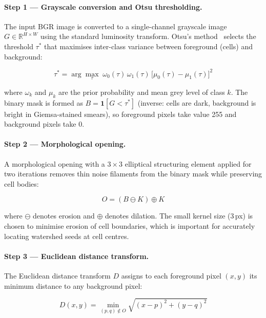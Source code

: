 \documentclass[review,12pt]{elsarticle}
\begin{document}
\paragraph{Step 1 --- Grayscale conversion and Otsu thresholding.}
The input BGR image is converted to a single-channel grayscale image
$G \in \mathbb{R}^{H \times W}$ using the standard luminosity transform.
Otsu's method~\cite{otsu1979} selects the threshold $\tau^*$ that maximises
inter-class variance between foreground (cells) and background:

\begin{equation}
  \tau^* = \arg\max_\tau \; \omega_0(\tau)\,\omega_1(\tau)\,
  \bigl[\mu_0(\tau) - \mu_1(\tau)\bigr]^2
  \label{eq:otsu}
\end{equation}

where $\omega_k$ and $\mu_k$ are the prior probability and mean grey level
of class $k$. The binary mask is formed as $B = \mathbf{1}[G < \tau^*]$
(inverse: cells are dark, background is bright in Giemsa-stained smears),
so foreground pixels take value 255 and background pixels take 0.

\paragraph{Step 2 --- Morphological opening.}
A morphological opening with a $3 \times 3$ elliptical structuring element
applied for two iterations removes thin noise filaments from the binary
mask while preserving cell bodies:

\begin{equation}
  O = (B \ominus K) \oplus K
  \label{eq:open}
\end{equation}

where $\ominus$ denotes erosion and $\oplus$ denotes dilation. The small
kernel size (3\,px) is chosen to minimise erosion of cell boundaries,
which is important for accurately locating watershed seeds at cell centres.

\paragraph{Step 3 --- Euclidean distance transform.}
The Euclidean distance transform $D$ assigns to each foreground pixel
$(x,y)$ its minimum distance to any background pixel:

\begin{equation}
  D(x,y) = \min_{(p,q) \notin O} \sqrt{(x-p)^2 + (y-q)^2}
  \label{eq:dist}
\end{equation}
\end{document}
